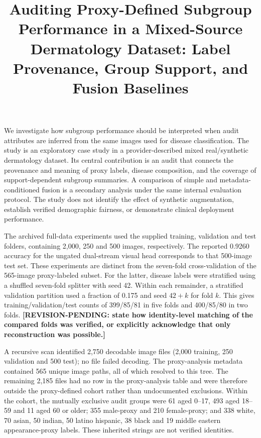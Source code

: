 
\title[Proxy-Defined Dermatology Audit]{Auditing Proxy-Defined Subgroup Performance in a Mixed-Source Dermatology Dataset: Label Provenance, Group Support, and Fusion Baselines}

We investigate how subgroup performance should be interpreted when audit
attributes are inferred from the same images used for disease classification.
The study is an exploratory case study in a provider-described mixed
real/synthetic dermatology dataset. Its central contribution is an audit that
connects the provenance and meaning of proxy labels, disease composition, and
the coverage of support-dependent subgroup summaries. A comparison of simple
and metadata-conditioned fusion is a secondary analysis under the same internal
evaluation protocol. The study does not identify the effect of synthetic
augmentation, establish verified demographic fairness, or demonstrate clinical
deployment performance.

The archived full-data experiments used the supplied training, validation and
test folders, containing 2,000, 250 and 500 images, respectively. The reported
0.9260 accuracy for the ungated dual-stream visual head corresponds to that
500-image test set. These experiments are distinct from the seven-fold
cross-validation of the 565-image proxy-labeled subset. For the latter, disease
labels were stratified using a shuffled seven-fold splitter with seed 42.
Within each remainder, a stratified validation partition used a fraction of
0.175 and seed $42+k$ for fold $k$. This gives training/validation/test counts
of 399/85/81 in five folds and 400/85/80 in two folds.
\textbf{[REVISION-PENDING: state how identity-level matching of the compared
folds was verified, or explicitly acknowledge that only reconstruction was
possible.]}

A recursive scan identified 2,750 decodable image files (2,000 training, 250
validation and 500 test); no file failed decoding. The proxy-analysis metadata
contained 565 unique image paths, all of which resolved to this tree. The
remaining 2,185 files had no row in the proxy-analysis table and were therefore
outside the proxy-defined cohort rather than undocumented exclusions. Within
the cohort, the mutually exclusive audit groups were 61 aged 0--17, 493 aged
18--59 and 11 aged 60 or older; 355 male-proxy and 210 female-proxy; and 338
white, 70 asian, 50 indian, 50 latino hispanic, 38 black and 19 middle eastern
appearance-proxy labels. These inherited strings are not verified identities.

